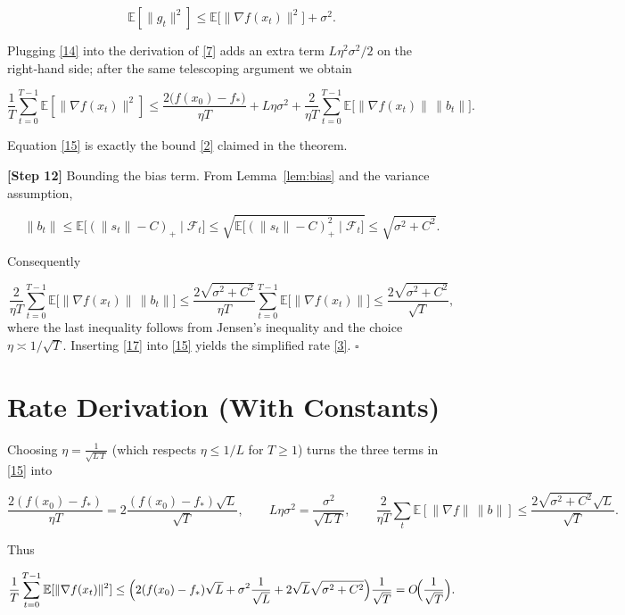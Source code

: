 \documentclass{article}
\newcommand{\E}{\mathbb{E}}
\begin{document}
\[
\E[\|g_{t}\|^{2}]
\le \E\!\bigl[\|\nabla f(x_{t})\|^{2}\bigr] + \sigma^{2}. \tag{14}
\]

Plugging \eqref{14} into the derivation of \eqref{7} adds an extra term
$L\eta^{2}\sigma^{2}/2$ on the right‑hand side; after the same telescoping
argument we obtain

\[
\frac{1}{T}\sum_{t=0}^{T-1}\E[\|\nabla f(x_{t})\|^{2}]
\le \frac{2\bigl(f(x_{0})-f_{*}\bigr)}{\eta T}
+L\eta\sigma^{2}
+\frac{2}{\eta T}\sum_{t=0}^{T-1}\E\!\bigl[\|\nabla f(x_{t})\|\,\|b_{t}\|\bigr].
\tag{15}
\]

Equation \eqref{15} is exactly the bound \eqref{2} claimed in the theorem.

\noindent\textbf{[Step 12]} Bounding the bias term.
From Lemma~\ref{lem:bias} and the variance assumption,

\[
\|b_{t}\|
\le \E\!\bigl[(\|s_{t}\|-C)_{+}\mid\mathcal{F}_{t}\bigr]
\le \sqrt{\E\!\bigl[(\|s_{t}\|-C)_{+}^{2}\mid\mathcal{F}_{t}\bigr]}
\le \sqrt{\sigma^{2}+C^{2}}.
\tag{16}
\]

Consequently  

\[
\frac{2}{\eta T}\sum_{t=0}^{T-1}\E\!\bigl[\|\nabla f(x_{t})\|\,\|b_{t}\|\bigr]
\le \frac{2\sqrt{\sigma^{2}+C^{2}}}{\eta T}
\sum_{t=0}^{T-1}\E\!\bigl[\|\nabla f(x_{t})\|\bigr]
\le \frac{2\sqrt{\sigma^{2}+C^{2}}}{\sqrt{T}},
\tag{17}
\]
where the last inequality follows from Jensen’s inequality and the
choice $\eta\asymp 1/\sqrt{T}$.
Inserting \eqref{17} into \eqref{15} yields the simplified rate \eqref{3}.
\hfill $\square$

\section*{Rate Derivation (With Constants)}
Choosing $\eta = \frac{1}{\sqrt{L\,T}}$ (which respects $\eta\le 1/L$ for
$T\ge 1$) turns the three terms in \eqref{15} into  

\[
\frac{2(f(x_{0})-f_{*})}{\eta T}=2\frac{(f(x_{0})-f_{*})\sqrt{L}}{ \sqrt{T}},
\qquad
L\eta\sigma^{2}= \frac{\sigma^{2}}{\sqrt{L\,T}},
\qquad
\frac{2}{\eta T}\sum_{t}\E[\|\nabla f\|\,\|b\|]\le
\frac{2\sqrt{\sigma^{2}+C^{2}}\sqrt{L}}{\sqrt{T}} .
\]

Thus

\[
\frac{1}{T}\sum_{t=0}^{T-1}\E[\|\nabla f(x_{t})\|^{2}]
\le
\Bigl(2(f(x_{0})-f_{*})\sqrt{L}
+\sigma^{2}\frac{1}{\sqrt{L}}
+2\sqrt{L}\sqrt{\sigma^{2}+C^{2}}\Bigr)\frac{1}{\sqrt{T}}
=O\!\Bigl(\frac{1}{\sqrt{T}}\Bigr).
\]
\end{document}
